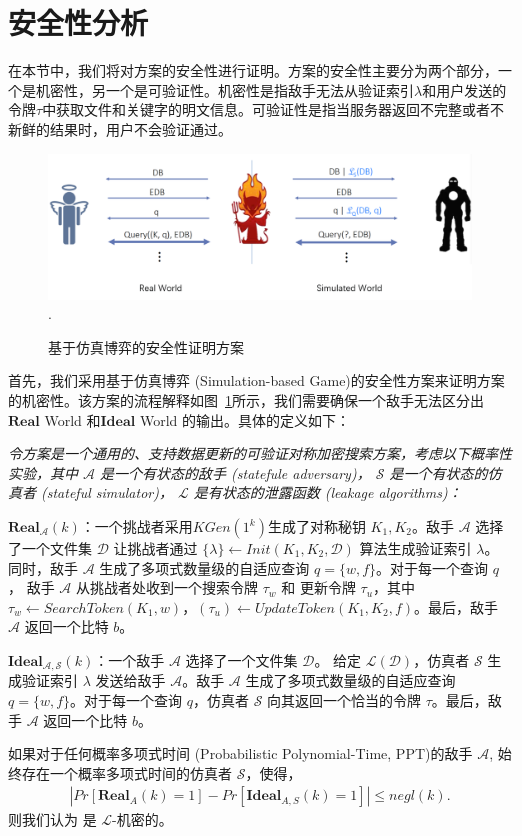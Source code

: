 \section{安全性分析}
在本节中，我们将对方案的安全性进行证明。方案的安全性主要分为两个部分，一个是机密性，另一个是可验证性。机密性是指敌手无法从验证索引$\lambda$和用户发送的令牌$\tau$中获取文件和关键字的明文信息。可验证性是指当服务器返回不完整或者不新鲜的结果时，用户不会验证通过。
\begin{figure}[t]
\centering
\includegraphics[width=6 in]{fig/security}
\DeclareGraphicsExtensions.
\caption{基于仿真博弈的安全性证明方案}
\label{fig:security}
\end{figure}

首先，我们采用基于仿真博弈 (Simulation-based Game)的安全性方案来证明方案的机密性。该方案的流程解释如图~\ref{fig:security}所示，我们需要确保一个敌手无法区分出$\mathbf{Real}$ World 和$\mathbf{Ideal}$ World 的输出。具体的定义如下：

\begin{definition}
  {\itshape
      令方案\single 是一个通用的、支持数据更新的可验证对称加密搜索方案，考虑以下概率性实验，其中 $\mathcal{A}$ 是一个有状态的敌手 (statefule adversary)， $\mathcal{S}$ 是一个有状态的仿真者 (stateful simulator)， $\mathcal{L}$ 是有状态的泄露函数 (leakage algorithms)：

      $\mathbf{Real}_\mathcal{A}(k)$：一个挑战者采用$KGen(1^k)$生成了对称秘钥 $K_1,K_2$。敌手 $\mathcal{A}$ 选择了一个文件集 $\mathcal{D}$ 让挑战者通过 $\{\lambda\} \leftarrow Init(K_1,K_2,\mathcal{D})$ 算法生成验证索引 $\lambda$。同时，敌手 $\mathcal{A}$ 生成了多项式数量级的自适应查询 $q = \{w,f\}$。对于每一个查询 $q$， 敌手 $\mathcal{A}$ 从挑战者处收到一个搜索令牌 $\tau_w$ 和 更新令牌 $\tau_u$，其中 $\tau_w \leftarrow SearchToken(K_1,w)$，$(\tau_u) \leftarrow UpdateToken(K_1,K_2,f)$。最后，敌手 $\mathcal{A}$ 返回一个比特 $b$。

      $\mathbf{Ideal}_\mathcal{A,S}(k)$：一个敌手 $\mathcal{A}$ 选择了一个文件集 $\mathcal{D}$。 给定 $\mathcal{L}(\mathcal{D})$，仿真者 $\mathcal{S}$ 生成验证索引 $\lambda$ 发送给敌手 $\mathcal{A}$。敌手 $\mathcal{A}$ 生成了多项式数量级的自适应查询 $q = \{w,f\}$。对于每一个查询 $q$，仿真者 $\mathcal{S}$ 向其返回一个恰当的令牌 $\tau$。最后，敌手 $\mathcal{A}$ 返回一个比特 $b$。

      如果对于任何概率多项式时间 (Probabilistic Polynomial-Time, PPT)的敌手 $\mathcal{A}$, 始终存在一个概率多项式时间的仿真者 $\mathcal{S}$，使得，
      \begin{align}
        |Pr[\mathbf{Real}_A(k) = 1] - Pr[\mathbf{Ideal}_{A,S}(k) = 1]| \leq negl(k).
      \end{align}
      则我们认为 \single 是 $\mathcal{L}$-机密的。
  }
\end{definition}

